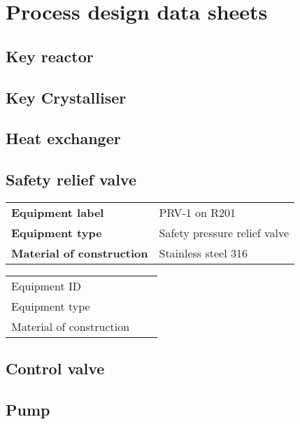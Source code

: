 \section{Process design data sheets}

\subsection{Key reactor}

\subsection{Key Crystalliser}

\subsection{Heat exchanger}

\subsection{Safety relief valve}

\begin{table}[H]
    \centering
    \begin{tabular}{@{}l|l@{}}
    \toprule
      \textbf{Equipment label}  & PRV-1 on R201\\
       \textbf{Equipment type}  & Safety pressure relief valve \\
       \textbf{Material of construction} & Stainless steel 316 \\
       \bottomrule
    \end{tabular}
\end{table}

\begin{table}[H]
    \centering
    \begin{tabular}{@{}l|l|l@{}}
    \toprule
       Equipment ID  & & \\
       Equipment type  &  & \\
       Material of construction & & \\
       \bottomrule
    \end{tabular}
\end{table}

\subsection{Control valve}

\subsection{Pump}


